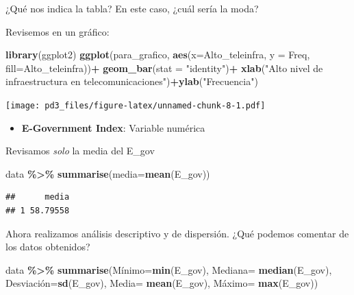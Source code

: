 \documentclass[
]{article}
\newenvironment{Shaded}{\begin{snugshade}}{\end{snugshade}}
\newcommand{\AttributeTok}[1]{\textcolor[rgb]{0.13,0.29,0.53}{#1}}
\newcommand{\FunctionTok}[1]{\textcolor[rgb]{0.13,0.29,0.53}{\textbf{#1}}}
\newcommand{\NormalTok}[1]{#1}
\newcommand{\OtherTok}[1]{\textcolor[rgb]{0.56,0.35,0.01}{#1}}
\newcommand{\SpecialCharTok}[1]{\textcolor[rgb]{0.81,0.36,0.00}{\textbf{#1}}}
\newcommand{\StringTok}[1]{\textcolor[rgb]{0.31,0.60,0.02}{#1}}
\providecommand{\tightlist}{%
  \setlength{\itemsep}{0pt}\setlength{\parskip}{0pt}}
\begin{document}
¿Qué nos indica la tabla? En este caso, ¿cuál sería la moda?

Revisemos en un gráfico:

\begin{Shaded}
\begin{Highlighting}[]
\FunctionTok{library}\NormalTok{(ggplot2)}
\FunctionTok{ggplot}\NormalTok{(para\_grafico, }\FunctionTok{aes}\NormalTok{(}\AttributeTok{x=}\NormalTok{Alto\_teleinfra, }\AttributeTok{y =}\NormalTok{ Freq, }\AttributeTok{fill=}\NormalTok{Alto\_teleinfra))}\SpecialCharTok{+}
  \FunctionTok{geom\_bar}\NormalTok{(}\AttributeTok{stat =} \StringTok{"identity"}\NormalTok{)}\SpecialCharTok{+} \FunctionTok{xlab}\NormalTok{(}\StringTok{"Alto nivel de infraestructura en telecomunicaciones"}\NormalTok{)}\SpecialCharTok{+}\FunctionTok{ylab}\NormalTok{(}\StringTok{"Frecuencia"}\NormalTok{)}
\end{Highlighting}
\end{Shaded}

\texttt{[image: pd3\_files/figure-latex/unnamed-chunk-8-1.pdf]}

\begin{itemize}
\tightlist
\item
  \textbf{E-Government Index}: Variable numérica
\end{itemize}

Revisamos \emph{solo} la media del E\_gov

\begin{Shaded}
\begin{Highlighting}[]
\NormalTok{data  }\SpecialCharTok{\%\textgreater{}\%} 
  \FunctionTok{summarise}\NormalTok{(}\AttributeTok{media=}\FunctionTok{mean}\NormalTok{(E\_gov))}
\end{Highlighting}
\end{Shaded}

\begin{verbatim}
##      media
## 1 58.79558
\end{verbatim}

Ahora realizamos análisis descriptivo y de dispersión. ¿Qué podemos
comentar de los datos obtenidos?

\begin{Shaded}
\begin{Highlighting}[]
\NormalTok{data  }\SpecialCharTok{\%\textgreater{}\%} 
  \FunctionTok{summarise}\NormalTok{(Mínimo}\OtherTok{=}\FunctionTok{min}\NormalTok{(E\_gov), }
            \AttributeTok{Mediana=} \FunctionTok{median}\NormalTok{(E\_gov), }
\NormalTok{            Desviación}\OtherTok{=}\FunctionTok{sd}\NormalTok{(E\_gov),}
            \AttributeTok{Media=} \FunctionTok{mean}\NormalTok{(E\_gov),}
\NormalTok{            Máximo}\OtherTok{=} \FunctionTok{max}\NormalTok{(E\_gov))}
\end{Highlighting}
\end{Shaded}
\end{document}
